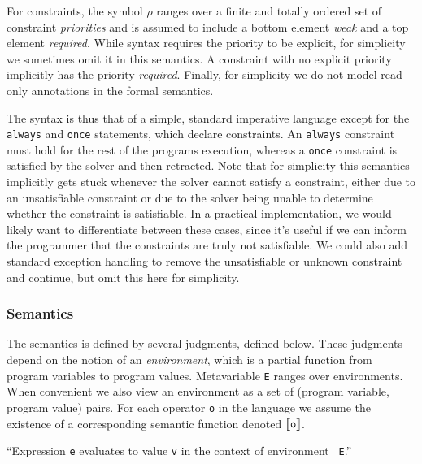 \documentclass{article}
\newcommand{\eval}[3]{{\tt #1} $\vdash$ {\tt #2} $\Downarrow$ {\tt #3}}
\newcommand{\inferrule}[3]{\infrule[#1]{\mbox{#2}}{\mbox{#3}}}
\newcommand{\inferax}[2]{\infax[#1]{\mbox{#2}}}
\newcommand{\judgment}[1]{\begin{flushleft} \fbox{#1}\end{flushleft}}
\begin{document}
For constraints, the symbol $\rho$ ranges over a finite and totally
ordered set of constraint {\em priorities} and is assumed to include a
bottom element {\em weak}
and a top element {\em required}. While syntax requires the priority to be
explicit, for simplicity we sometimes omit it in this semantics. A
constraint with no explicit priority implicitly has the priority {\em
  required}.  Finally, for simplicity we do not model read-only
annotations in the formal semantics.

The syntax is thus that of a simple, 
standard imperative language except for the
{\tt always} and {\tt once} statements, which declare constraints.
An {\tt always} constraint must
hold for the rest of the programs execution, whereas a {\tt once}
constraint is satisfied by the solver and then retracted. 
%
Note that for simplicity this semantics implicitly gets stuck whenever
the solver cannot satisfy a constraint, either due to an unsatisfiable
constraint or due to the solver being unable to determine whether the
constraint is satisfiable. In a practical implementation, we would
likely want to differentiate between 
these cases, since it's useful if we can
inform the programmer that the constraints are truly not satisfiable.
We could also add standard exception handling to remove the
unsatisfiable or unknown constraint and continue, but omit this here
for simplicity.

\subsubsection{Semantics}


The semantics is defined by several judgments, defined below.  These
judgments depend on the notion of an {\em environment}, which is a
partial function from program variables to program
values. Metavariable {\tt E} ranges over environments. When convenient
we also view an environment as a set of (program variable, program
value) pairs.  For each operator {\tt o} in the language we assume the
existence of a corresponding semantic function denoted
$\llbracket {\tt o} \rrbracket$.

\judgment{\eval{E}{e}{v}}

``Expression {\tt e} evaluates to value {\tt v} in the context of environment {\tt
  E}.''

\inferax{E-Const}{\eval{E}{c}{c}}
\inferrule{E-Var}{
  {\tt E(x) = v}
}{
  \eval{E}{x}{v}
}
\end{document}

